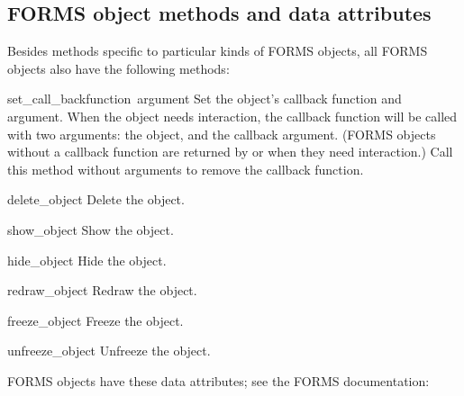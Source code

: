 \subsection{FORMS object methods and data attributes}

Besides methods specific to particular kinds of FORMS objects, all
FORMS objects also have the following methods:

\renewcommand{\indexsubitem}{(FORMS object method)}
\begin{funcdesc}{set_call_back}{function\, argument}
Set the object's callback function and argument.  When the object
needs interaction, the callback function will be called with two
arguments: the object, and the callback argument.  (FORMS objects
without a callback function are returned by  or
 when they need interaction.)  Call this method
without arguments to remove the callback function.
\end{funcdesc}

\begin{funcdesc}{delete_object}{}
  Delete the object.
\end{funcdesc}

\begin{funcdesc}{show_object}{}
  Show the object.
\end{funcdesc}

\begin{funcdesc}{hide_object}{}
  Hide the object.
\end{funcdesc}

\begin{funcdesc}{redraw_object}{}
  Redraw the object.
\end{funcdesc}

\begin{funcdesc}{freeze_object}{}
  Freeze the object.
\end{funcdesc}

\begin{funcdesc}{unfreeze_object}{}
  Unfreeze the object.
\end{funcdesc}



FORMS objects have these data attributes; see the FORMS documentation:

